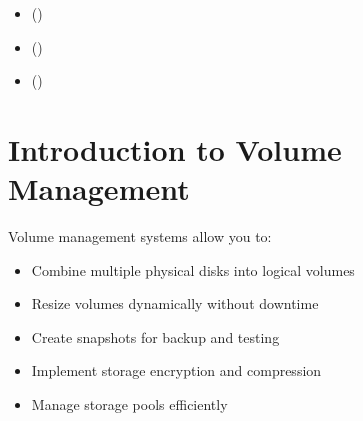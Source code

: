 \documentclass[letterpaper,10pt,english]{sphinxmanual}
\begin{document}
\begin{sphinxcontents}
\begin{itemize}
\begin{itemize}
\item {} 
\sphinxAtStartPar
{}\label{\detokenize{volume-management:id23}}{\hyperref[\detokenize{volume-management:automated-backup-script}]{}} ()

\end{itemize}

\item {} 
\sphinxAtStartPar
{}\label{\detokenize{volume-management:id24}}{\hyperref[\detokenize{volume-management:common-tasks-and-q-a}]{}} ()

\item {} 
\sphinxAtStartPar
{}\label{\detokenize{volume-management:id25}}{\hyperref[\detokenize{volume-management:best-practices}]{}} ()

\item {} 
\sphinxAtStartPar
{}\label{\detokenize{volume-management:id26}}{\hyperref[\detokenize{volume-management:see-also}]{}} ()

\end{itemize}
\end{sphinxcontents}


\section{Introduction to Volume Management}
\label{\detokenize{volume-management:introduction-to-volume-management}}
\sphinxAtStartPar
Volume management systems allow you to:
\begin{itemize}
\item {} 
\sphinxAtStartPar
Combine multiple physical disks into logical volumes

\item {} 
\sphinxAtStartPar
Resize volumes dynamically without downtime

\item {} 
\sphinxAtStartPar
Create snapshots for backup and testing

\item {} 
\sphinxAtStartPar
Implement storage encryption and compression

\item {} 
\sphinxAtStartPar
Manage storage pools efficiently

\end{itemize}
\end{document}
